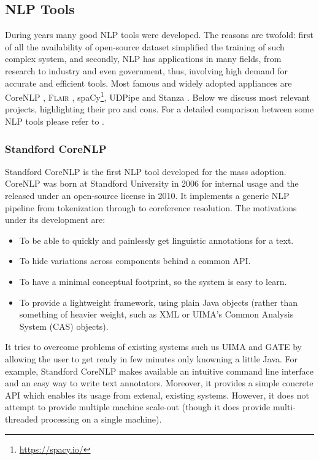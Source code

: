 \subsection{NLP Tools}

During years many good NLP tools were developed. The reasons are
twofold: first of all the availability of open-source dataset
simplified the training of such complex system, and secondly, NLP has
applications in many fields, from research to industry and even
government, thus, involving high demand for accurate and efficient
tools. Most famous and widely adopted appliances are CoreNLP
\cite{manning2014stanford}, \textsc{Flair} \cite{akbik2019flair},
spaCy\footnote{\href{https://spacy.io/}{https://spacy.io/}}, UDPipe
\cite{straka2018udpipe} and Stanza \cite{qi2020stanza}. Below we
discuss most relevant projects, highlighting their pro and cons. For a
detailed comparison between some NLP tools please refer to
\cite{schmitt2019replicable}.

\subsubsection{Standford CoreNLP}

Standford CoreNLP \cite{manning2014stanford} is the first NLP tool
developed for the mass adoption. CoreNLP was born at Standford
University in 2006 for internal usage and the released under an
open-source license in 2010. It implements a generic NLP pipeline from
tokenization through to coreference resolution. The motivations under
its development are:
\begin{itemize}
  \item To be able to quickly and painlessly get linguistic
  annotations for a text.
  \item To hide variations across components behind a common API.
  \item To have a minimal conceptual footprint, so the system is easy
  to learn.
  \item To provide a lightweight framework, using plain Java objects
  (rather than something of heavier weight, such as XML or UIMA's
  Common Analysis System (CAS) objects).
\end{itemize}
It tries to overcome problems of existing systems such us UIMA
\cite{ferrucci2004uima} and GATE \cite{cunningham2002gate} by allowing
the user to get ready in few minutes only knowning a little Java. For
example, Standford CoreNLP makes available an intuitive command line
interface and an easy way to write text annotators. Moreover, it
provides a simple concrete API which enables its usage from extenal,
existing systems. However, it does not attempt to provide multiple
machine scale-out (though it does provide multi-threaded processing on
a single machine).

